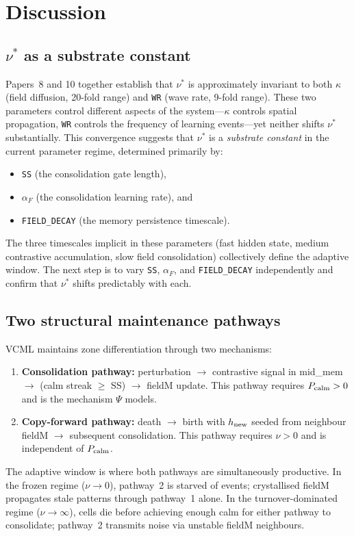 \documentclass[11pt]{article}
\begin{document}
\section{Discussion}

\subsection{$\nu^*$ as a substrate constant}

Papers~8 and 10 together establish that $\nu^*$ is approximately invariant to
both $\kappa$ (field diffusion, 20-fold range) and \texttt{WR} (wave rate,
9-fold range).
These two parameters control different aspects of the system---$\kappa$ controls
spatial propagation, \texttt{WR} controls the frequency of learning events---yet
neither shifts $\nu^*$ substantially.
This convergence suggests that $\nu^*$ is a \emph{substrate constant} in the
current parameter regime, determined primarily by:
\begin{itemize}
  \item \texttt{SS} (the consolidation gate length),
  \item $\alpha_F$ (the consolidation learning rate), and
  \item \texttt{FIELD\_DECAY} (the memory persistence timescale).
\end{itemize}
The three timescales implicit in these parameters (fast hidden state, medium
contrastive accumulation, slow field consolidation) collectively define the
adaptive window.
The next step is to vary \texttt{SS}, $\alpha_F$, and \texttt{FIELD\_DECAY}
independently and confirm that $\nu^*$ shifts predictably with each.

\subsection{Two structural maintenance pathways}

VCML maintains zone differentiation through two mechanisms:
\begin{enumerate}
  \item \textbf{Consolidation pathway:} perturbation $\to$ contrastive signal
    in mid\_mem $\to$ (calm streak $\geq$ SS) $\to$ fieldM update.
    This pathway requires $P_{\rm calm} > 0$ and is the mechanism $\Psi$ models.
  \item \textbf{Copy-forward pathway:} death $\to$ birth with $h_{\rm new}$
    seeded from neighbour fieldM $\to$ subsequent consolidation.
    This pathway requires $\nu > 0$ and is independent of $P_{\rm calm}$.
\end{enumerate}
The adaptive window is where both pathways are simultaneously productive.
In the frozen regime ($\nu \to 0$), pathway~2 is starved of events; crystallised
fieldM propagates stale patterns through pathway~1 alone.
In the turnover-dominated regime ($\nu \to \infty$), cells die before achieving
enough calm for either pathway to consolidate; pathway~2 transmits noise via
unstable fieldM neighbours.
\end{document}
